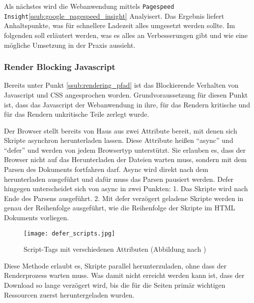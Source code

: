		Als nächstes wird die Webanwendung mittels \texttt{Pagespeed Insight}\ref{ssub:google_pagespeed_insight} Analyisert. Das Ergebnis liefert Anhaltspunkte, was für schnellere Ladezeit alles umgesetzt werden sollte. Im folgenden soll erläutert werden, was es alles an Verbesserungen gibt und wie eine mögliche Umsetzung in der Praxis aussieht.


		\subsubsection{Render Blocking Javascript} %
		\label{ssub:render_blocking_javascript}
			Bereits unter Punkt \ref{ssub:rendering_pfad} ist das Blockierende Verhalten von Javascript und CSS angesprochen worden. Grundvoraussetzung für diesen Punkt ist, dass das Javascript der Webanwendung in ihre, für das Rendern kritische und für das Rendern unkritische Teile zerlegt wurde. 

			Der Browser stellt bereits von Haus aus zwei Attribute bereit, mit denen sich Skripte asynchron herunterladen lassen. Diese Attribute heißen "`async"' und "`defer"' und werden von jedem Browsertyp unterstützt.\autocite{canIuse} Sie erlauben es, dass der Browser nicht auf das Herunterladen der Dateien warten muss, sondern mit dem Parsen des Dokuments fortfahren darf. Async wird direkt nach dem herunterladen ausgeführt und dafür muss das Parsen pausiert werden. Defer hingegen unterscheidet sich von async in zwei Punkten: 1. Das Skripte wird nach Ende des Parsens ausgeführt. 2. Mit defer verzögert geladene Skripte werden in genau der Reihenfolge ausgeführt, wie die Reihenfolge der Skripte im HTML Dokuments vorliegen.
			
			\begin{figure}[htbp]
				\begin{center}
					\texttt{[image: defer\_scripts.jpg]}
					\caption{Script-Tags mit verschiedenen Attributen (Abbildung nach \autocite{growing})}
					\label{fig:defer_scripts}
				\end{center}
			\end{figure}

			Diese Methode erlaubt es, Skripte parallel herunterzuladen, ohne dass der Renderprozess warten muss. Was damit nicht erreicht werden kann ist, dass der Download so lange verzögert wird, bis die für die Seiten primär wichtigen Ressourcen zuerst heruntergeladen wurden.\\

